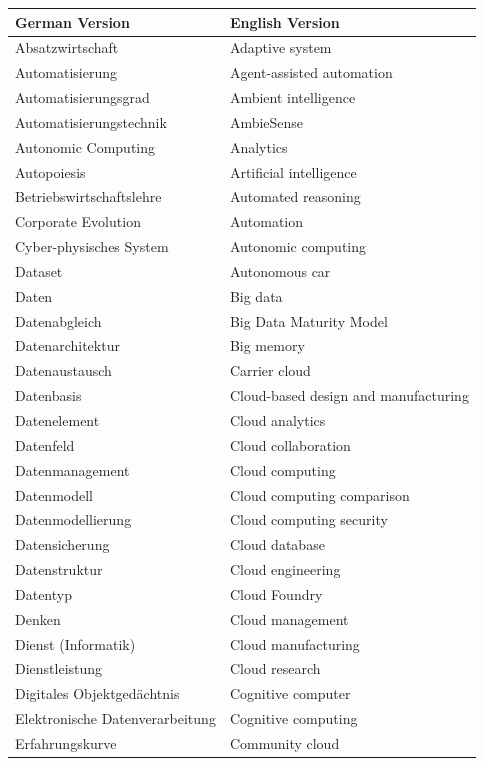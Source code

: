 \documentclass[]{book}
\begin{document}
\begin{tabular}{l|l}
\hline
German Version & English Version\\
\hline
Absatzwirtschaft & Adaptive system\\
\hline
Automatisierung & Agent-assisted automation\\
\hline
Automatisierungsgrad & Ambient intelligence\\
\hline
Automatisierungstechnik & AmbieSense\\
\hline
Autonomic Computing & Analytics\\
\hline
Autopoiesis & Artificial intelligence\\
\hline
Betriebswirtschaftslehre & Automated reasoning\\
\hline
Corporate Evolution & Automation\\
\hline
Cyber-physisches System & Autonomic computing\\
\hline
Dataset & Autonomous car\\
\hline
Daten & Big data\\
\hline
Datenabgleich & Big Data Maturity Model\\
\hline
Datenarchitektur & Big memory\\
\hline
Datenaustausch & Carrier cloud\\
\hline
Datenbasis & Cloud-based design and manufacturing\\
\hline
Datenelement & Cloud analytics\\
\hline
Datenfeld & Cloud collaboration\\
\hline
Datenmanagement & Cloud computing\\
\hline
Datenmodell & Cloud computing comparison\\
\hline
Datenmodellierung & Cloud computing security\\
\hline
Datensicherung & Cloud database\\
\hline
Datenstruktur & Cloud engineering\\
\hline
Datentyp & Cloud Foundry\\
\hline
Denken & Cloud management\\
\hline
Dienst (Informatik) & Cloud manufacturing\\
\hline
Dienstleistung & Cloud research\\
\hline
Digitales Objektgedächtnis & Cognitive computer\\
\hline
Elektronische Datenverarbeitung & Cognitive computing\\
\hline
Erfahrungskurve & Community cloud\\

\end{tabular}
\end{document}
